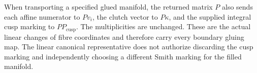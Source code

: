 When transporting a specified glued manifold, the returned
matrix $P$ also sends each affine numerator to $Pv_i$, the
clutch vector to $P\kappa$, and the supplied integral cusp
marking to $P P_{\mathrm{cusp}}$. The multiplicities are
unchanged. These are the actual linear changes of fibre
coordinates and therefore carry every boundary gluing map.
The linear canonical representative does not authorize
discarding the cusp marking and independently choosing a
different Smith marking for the filled manifold.
